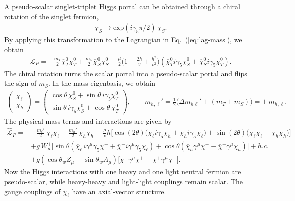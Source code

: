 \documentclass[nofootinbib,prd,aps,superscriptaddress,preprintnumbers]{revtex4}
\begin{document}
A pseudo-scalar singlet-triplet Higgs portal can be obtained through a chiral rotation of the singlet fermion,
\begin{align}
\chi_S \to \text{exp}(i \gamma_5 \pi/2)\,\chi_S.
\end{align}
By applying this transformation to the Lagrangian in Eq.~(\ref{eq:lag-mass}), we obtain
\begin{align}\label{eq:lag-mass-p}
\mathcal{L}_P = - \frac{m_T}{2} \overline{\chi}_T^0\chi_T^0 + \frac{m_S}{2} \overline{\chi}_S^0\chi_S^0 - \frac{\mu}{2}\Big(1 + \frac{2h}{v} + \frac{h^2}{v^2}\Big)\left(\overline{\chi}_T^0 i\gamma_5\chi_S^0 + \overline{\chi}_S^0 i\gamma_5\chi_T^0\right).
\end{align}The chiral rotation turns the scalar portal into a pseudo-scalar portal and flips the sign of $m_S$. In the mass eigenbasis, we obtain
\begin{align}\label{eq:estates-p}
\begin{pmatrix}
\chi_\ell\\
\chi_h
\end{pmatrix}
= \begin{pmatrix}
 \cos\theta\,\chi_S^0 + \sin\theta\,i\gamma_5\chi_T^0\\
  \sin\theta\,i \gamma_5 \chi_S^0 + \cos\theta\,\chi_T^0
\end{pmatrix},\qquad m_{h,\ell}' = \frac{1}{2}\Big( \Delta m_{h\ell}' \pm (m_T + m_S)\Big) = \pm\,m_{h,\ell}.
\end{align}
The physical mass terms and interactions are given by
\begin{align}\label{eq:lag-pseudo-scalar}
\widehat{\mathcal{L}}_P= & - \frac{m_{\ell}'}{2}\,\overline{\chi}_\ell\chi_\ell - \frac{m_{h}'}{2}\,\overline{\chi}_h\chi_h - \frac{\mu}{v} h \Big[\cos(2\theta) \big(\overline{\chi}_\ell i\gamma_5 \chi_h + \overline{\chi}_h i\gamma_5 \chi_\ell\big) + \sin(2\theta) \big(\overline{\chi}_\ell \chi_\ell + \overline{\chi}_h \chi_h\big)\Big]\\\nonumber
& + g\,W_\mu^+\Big[ \sin\theta \left(\overline{\chi}_\ell\,i \gamma^\mu\gamma_5 \chi^- + \overline{\chi}^- i \gamma^\mu\gamma_5 \chi_\ell \right) + \cos\theta \left(\overline{\chi}_h \gamma^\mu \chi^- - \overline{\chi}^- \gamma^\mu \chi_h \right) \Big] + h.c.\\\nonumber
& + g\left(\cos\theta_w Z_\mu - \sin\theta_w A_\mu \right) \big[ \overline{\chi}^-\gamma^\mu \chi^+ - \overline{\chi}^+\gamma^\mu \chi^- \big].
\end{align}
Now the Higgs interactions with one heavy and one light neutral fermion are pseudo-scalar, while heavy-heavy and light-light couplings remain scalar. The gauge couplings of $\chi_\ell$ have an axial-vector structure.
\end{document}
